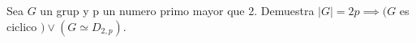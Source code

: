 \question 
Sea $G$ un grup y p un numero primo mayor que 2. Demuestra $|G|=2p \implies (G$ es ciclico $)\lor (G \simeq D_{2,p})$.